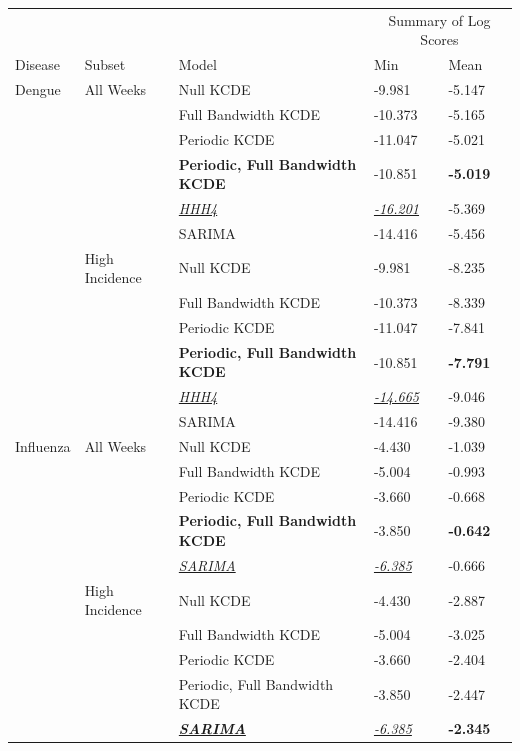 \documentclass[times, doublespace]{simauth}\usepackage[]{graphicx}\usepackage[]{color}
\begin{document}
\begin{table}[hp]
\begin{tabular}{lllll}
\toprule
         &          &              &    \multicolumn{2}{c}{Summary of Log Scores} \\
\cline{4-5}
 Disease & Subset & Model & Min & Mean \\
  \hline
Dengue & All Weeks & Null KCDE & -9.981 & -5.147\\
 &  & Full Bandwidth KCDE & -10.373 & -5.165\\
 &  & Periodic KCDE & -11.047 & -5.021\\
 &  & \textbf{Periodic, Full Bandwidth KCDE} & -10.851 & \textbf{-5.019}\\
 &  & \underline{\emph{HHH4}} & \underline{\emph{-16.201}} & -5.369\\
 &  & SARIMA & -14.416 & -5.456\\
\cline{2-5}
\cline{2-5}
 & High Incidence & Null KCDE & -9.981 & -8.235\\
 &  & Full Bandwidth KCDE & -10.373 & -8.339\\
 &  & Periodic KCDE & -11.047 & -7.841\\
 &  & \textbf{Periodic, Full Bandwidth KCDE} & -10.851 & \textbf{-7.791}\\
 &  & \underline{\emph{HHH4}} & \underline{\emph{-14.665}} & -9.046\\
 &  & SARIMA & -14.416 & -9.380\\
\midrule
Influenza & All Weeks & Null KCDE & -4.430 & -1.039\\
 &  & Full Bandwidth KCDE & -5.004 & -0.993\\
 &  & Periodic KCDE & -3.660 & -0.668\\
 &  & \textbf{Periodic, Full Bandwidth KCDE} & -3.850 & \textbf{-0.642}\\
 &  & \underline{\emph{SARIMA}} & \underline{\emph{-6.385}} & -0.666\\
\cline{2-5}
\cline{2-5}
 & High Incidence & Null KCDE & -4.430 & -2.887\\
 &  & Full Bandwidth KCDE & -5.004 & -3.025\\
 &  & Periodic KCDE & -3.660 & -2.404\\
 &  & Periodic, Full Bandwidth KCDE & -3.850 & -2.447\\
 &  & \textbf{\underline{\emph{SARIMA}}} & \underline{\emph{-6.385}} & \textbf{-2.345}\\


\end{tabular}
\end{table}
\end{document}
